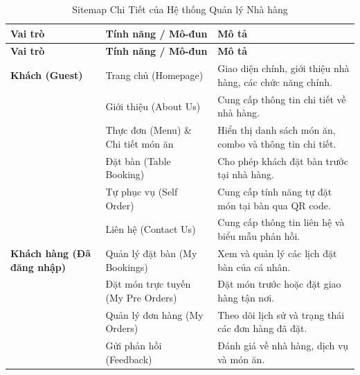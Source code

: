 \begin{longtable}{
    >{\raggedright\arraybackslash}p{2.5cm} %
    >{\raggedright\arraybackslash}p{4.5cm} %
    p{8cm}  %
}
\caption{Sitemap Chi Tiết của Hệ thống Quản lý Nhà hàng} \\
\toprule
\textbf{Vai trò} & \textbf{Tính năng / Mô-đun} & \textbf{Mô tả} \\
\midrule
\endfirsthead %

\toprule
\textbf{Vai trò} & \textbf{Tính năng / Mô-đun} & \textbf{Mô tả} \\
\midrule
\endhead %

\bottomrule
\endfoot %


\textbf{Khách (Guest)}
    & Trang chủ (Homepage)
    & Giao diện chính, giới thiệu nhà hàng, các chức năng chính. \\
\cmidrule(lr){2-3}
    & Giới thiệu (About Us)
    & Cung cấp thông tin chi tiết về nhà hàng. \\
\cmidrule(lr){2-3}
    & Thực đơn (Menu) \& Chi tiết món ăn
    & Hiển thị danh sách món ăn, combo và thông tin chi tiết. \\
\cmidrule(lr){2-3}
    & Đặt bàn (Table Booking)
    & Cho phép khách đặt bàn trước tại nhà hàng. \\
\cmidrule(lr){2-3}
    & Tự phục vụ (Self Order)
    & Cung cấp tính năng tự đặt món tại bàn qua QR code. \\
\cmidrule(lr){2-3}
    & Liên hệ (Contact Us)
    & Cung cấp thông tin liên hệ và biểu mẫu phản hồi. \\
\midrule

\textbf{Khách hàng (Đã đăng nhập)}
    & Quản lý đặt bàn (My Bookings)
    & Xem và quản lý các lịch đặt bàn của cá nhân. \\
\cmidrule(lr){2-3}
    & Đặt món trực tuyến (My Pre Orders)
    & Đặt món trước hoặc đặt giao hàng tận nơi. \\
\cmidrule(lr){2-3}
    & Quản lý đơn hàng (My Orders)
    & Theo dõi lịch sử và trạng thái các đơn hàng đã đặt. \\
\cmidrule(lr){2-3}
    & Gửi phản hồi (Feedback)
    & Đánh giá về nhà hàng, dịch vụ và món ăn. \\
\midrule


\end{longtable}
